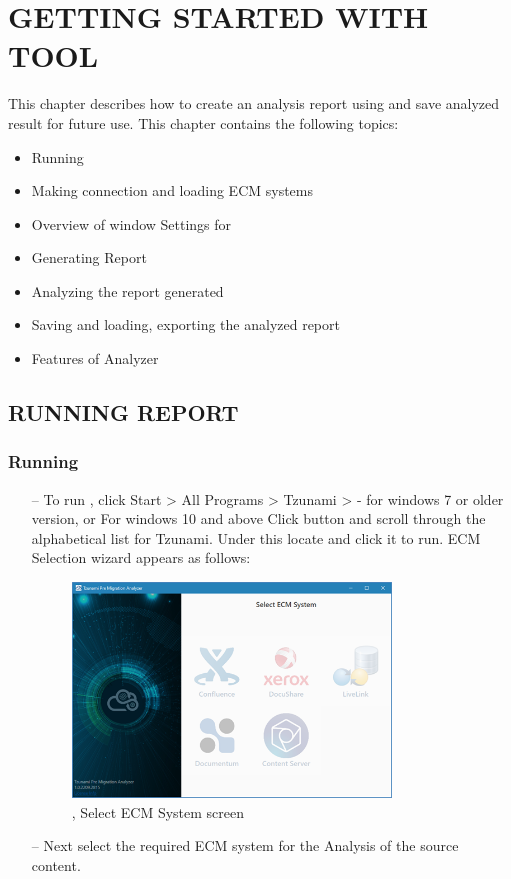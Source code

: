 \chapter{GETTING STARTED WITH \MakeUppercase{\appName} TOOL}
This chapter describes how to create an analysis report using \appName and save analyzed result for future use. This chapter contains the following topics:
\begin{itemize}
  \item Running \appName
  \item Making connection and loading ECM systems
  \item Overview of \appName window Settings for \appName
  \item Generating Report
  \item Analyzing the report generated
  \item Saving and loading, exporting the analyzed report
  \item Features of Analyzer
\end{itemize}
 \section{RUNNING \MakeUppercase{\appName} REPORT}

\subsection{Running \appName}
\begin{itemize}
\item[--] To run \appName, click Start > All Programs > Tzunami > \appName - for windows 7 or older version, or
For windows 10 and above
Click    button and scroll through the alphabetical list for Tzunami. Under this locate \appName and click it to run. ECM Selection wizard appears as follows:
\begin{figure} 
  \centering
	\includegraphics[width=0.8\textwidth]{Images/SelectEccmScreen.png}
 \caption{\appName, Select ECM System screen}
\end{figure}
\item[--] Next select the required ECM system for the Analysis of the source content.
\end{itemize}
